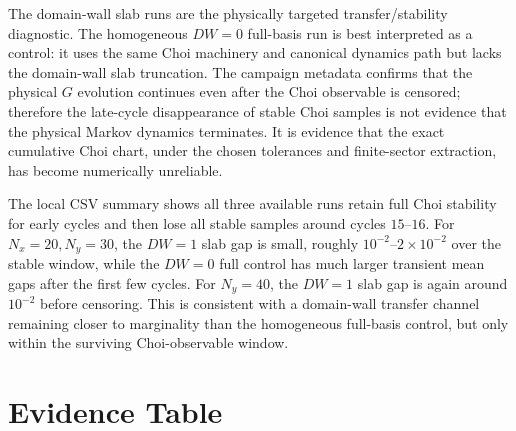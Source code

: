 \documentclass[aps,prb,onecolumn,nofootinbib,superscriptaddress]{revtex4-2}
\begin{document}
The domain-wall slab runs are the physically targeted transfer/stability
diagnostic.  The homogeneous \(DW=0\) full-basis run is best interpreted as a
control: it uses the same Choi machinery and canonical dynamics path but lacks
the domain-wall slab truncation.  The campaign metadata confirms that the
physical \(G\) evolution continues even after the Choi observable is censored;
therefore the late-cycle disappearance of stable Choi samples is not evidence
that the physical Markov dynamics terminates.  It is evidence that the exact
cumulative Choi chart, under the chosen tolerances and finite-sector extraction,
has become numerically unreliable.

The local CSV summary shows all three available runs retain full Choi stability
for early cycles and then lose all stable samples around cycles \(15\)--\(16\).
For \(N_x=20,N_y=30\), the \(DW=1\) slab gap is small, roughly
\(10^{-2}\)--\(2\times10^{-2}\) over the stable window, while the \(DW=0\) full
control has much larger transient mean gaps after the first few cycles.  For
\(N_y=40\), the \(DW=1\) slab gap is again around \(10^{-2}\) before censoring.
This is consistent with a domain-wall transfer channel remaining closer to
marginality than the homogeneous full-basis control, but only within the
surviving Choi-observable window.

\section{Evidence Table}
\end{document}
